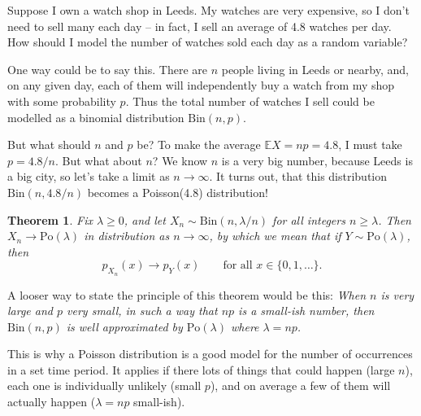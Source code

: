 \documentclass[
  a4paper,
]{book}
\newtheorem{theorem}{Theorem}[chapter]
\theoremstyle{definition}
\theoremstyle{definition}
\theoremstyle{definition}
\theoremstyle{definition}
\theoremstyle{remark}
\begin{document}
Suppose I own a watch shop in Leeds. My watches are very expensive, so I don't need to sell many each day -- in fact, I sell an average of 4.8 watches per day. How should I model the number of watches sold each day as a random variable?

One way could be to say this. There are \(n\) people living in Leeds or nearby, and, on any given day, each of them will independently buy a watch from my shop with some probability \(p\). Thus the total number of watches I sell could be modelled as a binomial distribution \(\text{Bin}(n, p)\).

But what should \(n\) and \(p\) be? To make the average \(\mathbb EX = np = 4.8\), I must take \(p = 4.8/n\). But what about \(n\)? We know \(n\) is a very big number, because Leeds is a big city, so let's take a limit as \(n \to \infty\). It turns out, that this distribution \(\text{Bin}(n, 4.8/n)\) becomes a Poisson(4.8) distribution!

\begin{theorem}
\protect\hypertarget{thm:po-bint}{}\label{thm:po-bint}Fix \(\lambda \geq 0\), and let \(X_n \sim \text{Bin}(n, \lambda/n)\) for all integers \(n \geq \lambda\). Then \(X_n \to \text{Po}(\lambda)\) in distribution as \(n \to \infty\), by which we mean that if \(Y \sim \text{Po}(\lambda)\), then
\[ p_{X_n}(x) \to p_Y(x) \qquad \text{for all $x \in \{0, 1, \dots \}$}. \]
\end{theorem}

A looser way to state the principle of this theorem would be this: \emph{When \(n\) is very large and \(p\) very small, in such a way that \(np\) is a small-ish number, then \(\text{Bin}(n,p)\) is well approximated by \(\text{Po}(\lambda)\) where \(\lambda = np\).}

This is why a Poisson distribution is a good model for the number of occurrences in a set time period. It applies if there lots of things that could happen (large \(n\)), each one is individually unlikely (small \(p\)), and on average a few of them will actually happen (\(\lambda = np\) small-ish).
\end{document}

